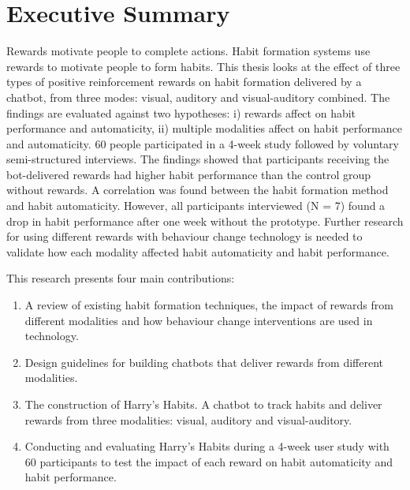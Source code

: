 
\section*{Executive Summary}
Rewards motivate people to complete actions. Habit formation systems use rewards to motivate people to form habits. This thesis looks at the effect of three types of positive reinforcement rewards on habit formation delivered by a chatbot, from three modes: visual, auditory and visual-auditory combined. The findings are evaluated against two hypotheses: i) rewards affect on habit performance and automaticity, ii) multiple modalities affect on habit performance and automaticity. 60 people participated in a 4-week study followed by voluntary semi-structured interviews. The findings showed that participants receiving the bot-delivered rewards had higher habit performance than the control group without rewards. A correlation was found between the habit formation method and habit automaticity. However, all participants interviewed (N = 7) found a drop in habit performance after one week without the prototype. Further research for using different rewards with behaviour change technology is needed to validate how each modality affected habit automaticity and habit performance.


This research presents four main contributions:

\begin{enumerate}
  \item A review of existing habit formation techniques, the impact of rewards from different modalities and how behaviour change interventions are used in technology.
  \item Design guidelines for building chatbots that deliver rewards from different modalities.
  \item The construction of Harry's Habits. A chatbot to track habits and deliver rewards from three modalities: visual, auditory and visual-auditory.
  \item Conducting and evaluating Harry's Habits during a 4-week user study with 60 participants to test the impact of each reward on habit automaticity and habit performance.
\end{enumerate}

\newpage



